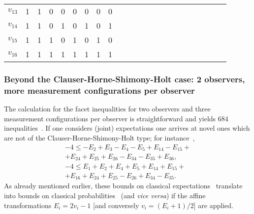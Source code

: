 \documentclass[%
  twocolumn,
 showpacs,
 showkeys,
 preprintnumbers,
 amsmath,amssymb,
 aps,
  pra,
  longbibliography,
 floatfix,
 ]{revtex4-1}
\begin{document}
\begin{table}
\begin{center}
\begin{ruledtabular}
\begin{tabular}{ccccccccccccccccccccccc}
$v_{13}$&1  &  1 &   0 &   0  & {\color{green}  0}&   {\color{green}  0} &  {\color{green}   0}  &  {\color{green}  0}\\
$v_{14}$&1  &  1 &   0 &   1  & {\color{red}  0}&   {\color{red}  1} &  {\color{red}  0}  &  {\color{red}  1}\\
$v_{15}$&1  &  1 &   1 &   0  & {\color{red}  1}&   {\color{red}  0} &  {\color{red}  1}  &  {\color{red}  0}\\
$v_{16}$&1  &  1 &   1 &   1  & {\color{red}  1}&   {\color{red}  1} &  {\color{red}  1}  &  {\color{red}  1}
\end{tabular}
 \end{ruledtabular}
 \end{center}
 \end{table}




\subsubsection{Beyond the Clauser-Horne-Shimony-Holt case: 2 observers, more measurement configurations per observer}
\label{2017-b-chshc1b}

The calculation for the facet inequalities for two observers and three measurement configurations per observer is straightforward
and yields  684 inequalities~\cite{2000-poly,sliwa-2003,collins-gisin-2003}.
If one considers (joint) expectations one arrives at novel ones
which are not of the Clauser-Horne-Shimony-Holt type; for instance~\cite[p.~166, Eq.~(4)]{sliwa-2003},
\begin{equation}
\begin{split}
-4   \le    -E_2  +E_3 -E_4  -E_5  +E_{14} -E_{15} +    \\+E_{24}  +E_{25}  +E_{26} -E_{34} -E_{35}  +E_{36},     \\
-4 \le   E_1  +E_2   +E_4  +E_5    +E_{14}  +E_{15} + \\+E_{16}  +E_{24}  +E_{25} -E_{26}  +E_{34} -E_{35}.
\end{split}
\label{2017-b-2-3-e-full}
\end{equation}
As already mentioned earlier, these bounds on classical expectations~\cite{sliwa-2003}
translate into bounds on classical probabilities~\cite{2000-poly,collins-gisin-2003} (and {\em vice versa})
if the affine transformations
$E_i = 2 v_i - 1$ [and conversely $v_i = (E_i +1)/2$] are applied.
\end{document}
